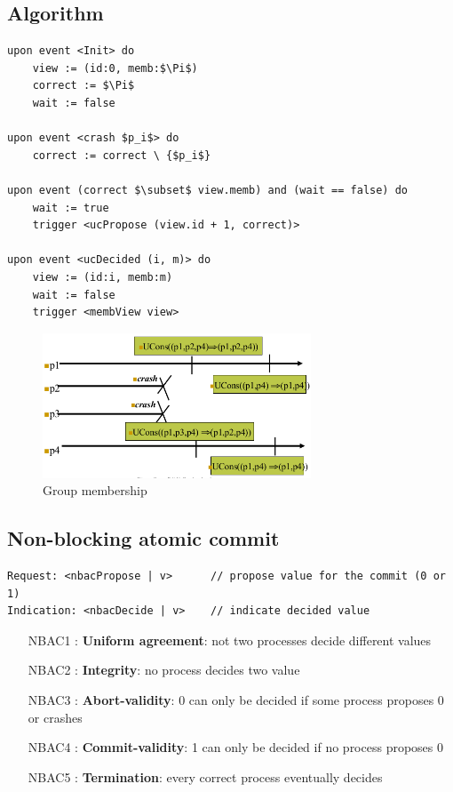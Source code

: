 \subsection{Algorithm}
\begin{lstlisting}[caption=Group membership, mathescape]
upon event <Init> do
    view := (id:0, memb:$\Pi$)
    correct := $\Pi$
    wait := false

upon event <crash $p_i$> do
    correct := correct \ {$p_i$}

upon event (correct $\subset$ view.memb) and (wait == false) do
    wait := true
    trigger <ucPropose (view.id + 1, correct)>

upon event <ucDecided (i, m)> do
    view := (id:i, memb:m)
    wait := false
    trigger <membView view>
\end{lstlisting}

\begin{figure}[!ht]
		\includegraphics[width=8cm]{img/gmp_1.png}
	\caption{Group membership}
\end{figure}
\FloatBarrier{}

\subsection{Non-blocking atomic commit}
\begin{lstlisting}
Request: <nbacPropose | v>      // propose value for the commit (0 or 1)
Indication: <nbacDecide | v>    // indicate decided value
\end{lstlisting}

\begin{itemize}
    \item[NBAC1]: \textbf{Uniform agreement}: not two processes decide different values
    \item[NBAC2]: \textbf{Integrity}: no process decides two value
    \item[NBAC3]: \textbf{Abort-validity}: 0 can only be decided if some process proposes 0 or crashes
    \item[NBAC4]: \textbf{Commit-validity}: 1 can only be decided if no process proposes 0
    \item[NBAC5]: \textbf{Termination}: every correct process eventually decides
\end{itemize}
